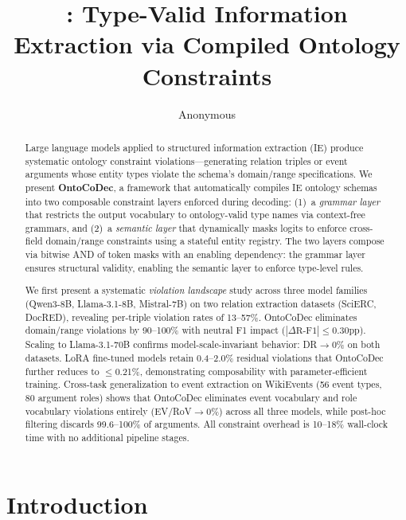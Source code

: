 \documentclass[11pt]{article}
\title{\sys{}: Type-Valid Information Extraction via Compiled Ontology Constraints}
\author{Anonymous}
\date{}
\newcommand{\sys}{OntoCoDec}
\begin{document}
\maketitle

\begin{abstract}
Large language models applied to structured information extraction (IE) produce systematic ontology constraint violations---generating relation triples or event arguments whose entity types violate the schema's domain/range specifications.
We present \textbf{\sys{}}, a framework that automatically compiles IE ontology schemas into two composable constraint layers enforced during decoding: (1)~a \emph{grammar layer} that restricts the output vocabulary to ontology-valid type names via context-free grammars, and (2)~a \emph{semantic layer} that dynamically masks logits to enforce cross-field domain/range constraints using a stateful entity registry.
The two layers compose via bitwise AND of token masks with an enabling dependency: the grammar layer ensures structural validity, enabling the semantic layer to enforce type-level rules.

We first present a systematic \emph{violation landscape} study across three model families (Qwen3-8B, Llama-3.1-8B, Mistral-7B) on two relation extraction datasets (SciERC, DocRED), revealing per-triple violation rates of 13--57\%.
\sys{} eliminates domain/range violations by 90--100\% with neutral F1 impact ($|\Delta\text{R-F1}| \leq 0.30$pp).
Scaling to Llama-3.1-70B confirms model-scale-invariant behavior: DR$\to$0\% on both datasets.
LoRA fine-tuned models retain 0.4--2.0\% residual violations that \sys{} further reduces to $\leq$0.21\%, demonstrating composability with parameter-efficient training.
Cross-task generalization to event extraction on WikiEvents (56 event types, 80 argument roles) shows that \sys{} eliminates event vocabulary and role vocabulary violations entirely (EV/RoV$\to$0\%) across all three models, while post-hoc filtering discards 99.6--100\% of arguments.
All constraint overhead is 10--18\% wall-clock time with no additional pipeline stages.
\end{abstract}

\section{Introduction}
\label{sec:intro}
\end{document}
